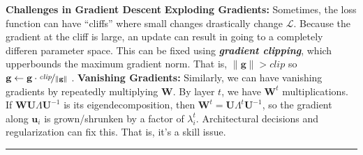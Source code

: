 \documentclass{article}
\newcommand{\g}{\bf{g}}
\renewcommand{\u}{\bf{u}}
\newcommand{\U}{\bf{U}}
\newcommand{\W}{\bf{W}}
\newcommand{\ot}{\leftarrow}
\renewcommand{\bf}[1]{\textbf{{#1}}}
\renewcommand{\it}[1]{\textit{{#1}}}
\newcommand{\ib}[1]{\textit{\textbf{{#1}}}}
\renewcommand{\L}{\mathcal{L}}
\begin{document}
\begin{small}
\bf{Challenges in Gradient Descent}
\newline
\bf{Exploding Gradients:} Sometimes, the loss function can have ``cliffs'' where small changes
drastically change $\L$. Because the gradient at the cliff is large, an update can result in going
to a completely differen parameter space. This can be fixed using \ib{gradient clipping}, which
upperbounds the maximum gradient norm. That is, 
$\|\g\| > \it{clip}$ so $\g \ot \g \cdot \nicefrac{\it{clip}}{\|\g\|}$ .
\newline
\bf{Vanishing Gradients:} Similarly, we can have vanishing gradients by repeatedly multiplying $\W$.
By layer $t$, we have $\W^t$ multiplications. If $\W \U \Lambda \U^{-1}$ is its eigendecomposition,
then $\W^t = \U \Lambda^t \U^{-1}$, so the gradient along $\u_i$ is grown/shrunken by a factor of
$\lambda_i^t$. Architectural decisions and regularization can fix this. That is, it's a skill issue.
\hrule
\vspace{0.1em}


\end{small}
\end{document}
